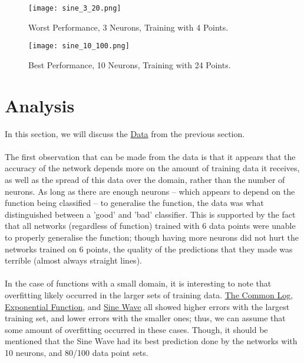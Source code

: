 \documentclass{article}
\begin{document}
		\begin{figure}[!ht]
			\texttt{[image: sine\_3\_20.png]}
			\caption{Worst Performance, 3 Neurons, Training with 4 Points.}
			\label{F_S_1}
		\end{figure}
		\begin{figure}[!ht]
			\texttt{[image: sine\_10\_100.png]}
			\caption{Best Performance, 10 Neurons, Training with 24 Points.}
			\label{F_S_2}
		\end{figure}

\pagebreak
\section{Analysis}\label{S4}
	In this section, we will discuss the \hyperref[S3]{Data} from the previous section. \\ 
	\\The first observation that can be made from the data is that it appears that the accuracy of the network depends more on the amount of training data it receives, as well as the spread of this data over the domain, rather than the number of neurons. As long as there are enough neurons -- which appears to depend on the function being classified -- to generalise the function, the data was what distinguished between a 'good' and 'bad' classifier. This is supported by the fact that all networks (regardless of function) trained with 6 data points were unable to properly generalise the function; though having more neurons did not hurt the networks trained on 6 points, the quality of the predictions that they made was terrible (almost always straight lines).\\
	\\ In the case of functions with a small domain, it is interesting to note that overfitting likely occurred in the larger sets of training data. \hyperref[T2]{The Common Log}, \hyperref[T3]{Exponential Function}, and \hyperref[T4]{Sine Wave} all showed higher errors with the largest training set, and lower errors with the smaller ones; thus, we can assume that some amount of overfitting occurred in these cases. Though, it should be mentioned that the Sine Wave had its best prediction done by the networks with 10 neurons, and 80/100 data point sets. \\
	
\end{document}
